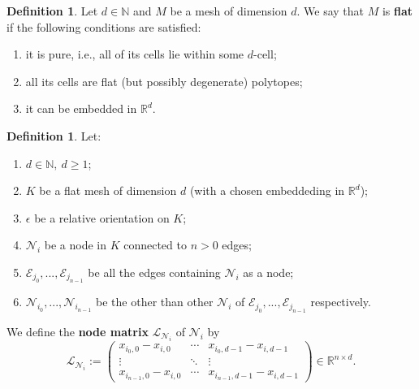 \documentclass[fleqn]{article}
\theoremstyle{definition}
\newtheorem{definition}[theorem]{Definition}
\newcommand{\N}{\mathbb{N}}
\newcommand{\R}{\mathbb{R}}
\begin{document}
\begin{definition}
  Let $d\in \N$ and $M$ be a mesh of dimension $d$.
  We say that $M$ is \textbf{flat} if the following conditions are satisfied:
  \begin{enumerate}
    \item
      it is pure, i.e., all of its cells lie within some $d$-cell;
    \item
      all its cells are flat (but possibly degenerate) polytopes;
    \item
      it can be embedded in $\R^d$.
  \end{enumerate}
\end{definition}

\begin{definition}
  Let:
  \begin{enumerate}
    \item
      $d \in \N,\ d \geq 1$;
    \item
      $K$ be a flat mesh of dimension $d$
      (with a chosen embeddeding in $\R^d$);
    \item
      $\epsilon$ be a relative orientation on $K$;
    \item
      $\mathcal{N}_i$ be a node in $K$ connected to $n > 0$ edges;
    \item
      $\mathcal{E}_{j_0}, ..., \mathcal{E}_{j_{n - 1}}$ be all the edges
      containing $\mathcal{N}_i$ as a node;
    \item
      $\mathcal{N}_{i_0}, ..., \mathcal{N}_{i_{n - 1}}$ be the other than
      other $\mathcal{N}_i$ of
      $\mathcal{E}_{j_0}, ..., \mathcal{E}_{j_{n - 1}}$ respectively.
  \end{enumerate}
  We define the \textbf{node matrix} $\mathcal{L}_{\mathcal{N}_i}$ of
  $\mathcal{N}_i$ by
  \begin{equation}
    \mathcal{L}_{\mathcal{N}_i} :=
    \begin{pmatrix}
      x_{i_0, 0} - x_{i, 0} & \cdots & x_{i_0, d - 1} - x_{i, d - 1} \\
      \vdots & \ddots & \vdots \\
      x_{i_{n - 1}, 0} - x_{i, 0} & \cdots & x_{i_{n - 1}, d - 1} - x_{i, d - 1}
    \end{pmatrix}
    \in \R^{n \times d}.
  \end{equation}
\end{definition}
\end{document}
